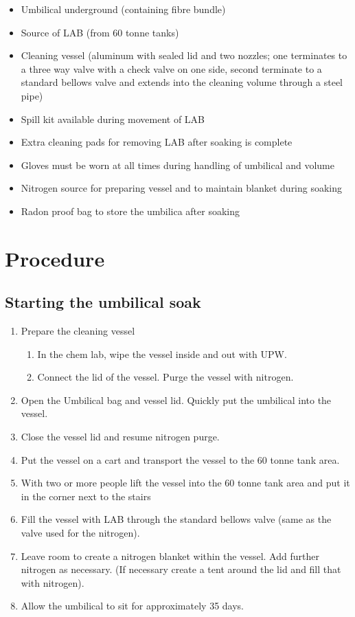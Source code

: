 \begin{itemize}
\item Umbilical underground (containing fibre bundle)
\item Source of LAB (from 60 tonne tanks)
\item Cleaning vessel (aluminum with sealed lid and two nozzles; one terminates to a three way valve with a check valve on one side, second terminate to a standard bellows valve and extends into the cleaning volume through a steel pipe)
\item Spill kit available during movement of LAB
\item Extra cleaning pads for removing LAB after soaking is complete
\item Gloves must be worn at all times during handling of umbilical and volume
\item Nitrogen source for preparing vessel and to maintain blanket during soaking
\item Radon proof bag to store the umbilica after soaking
\end{itemize}

\section{Procedure}
\subsection{Starting the umbilical soak}
\begin{enumerate}
\item Prepare the cleaning vessel
  \begin{enumerate}
  \item In the chem lab, wipe the vessel inside and out with UPW. 
  \item Connect the lid of the vessel. Purge the vessel with nitrogen.
  \end{enumerate}
\item Open the Umbilical bag and vessel lid. Quickly put the umbilical into the vessel.
\item Close the vessel lid and resume nitrogen purge.
\item Put the vessel on a cart and transport the vessel to the 60 tonne tank area.
\item With two or more people lift the vessel into the 60 tonne tank area and put it in the corner next to the stairs
\item Fill the vessel with LAB through the standard bellows valve (same as the valve used for the nitrogen).
\item Leave room to create a nitrogen blanket within the vessel. Add further nitrogen as necessary. (If necessary create a tent around the lid and fill that with nitrogen).
\item Allow the umbilical to sit for approximately 35 days.
\end{enumerate}  

